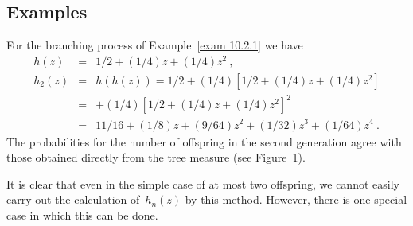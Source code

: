 \subsection*{Examples}

\begin{example}\label{exam 10.2.3.5}
For the branching process of Example~\ref{exam 10.2.1} we have
\begin{eqnarray*}
  h(z) &=& 1/2 + (1/4)z + (1/4)z^2\ , \\
h_2(z) &=& h(h(z)) = 1/2 + (1/4)[1/2 + (1/4)z + (1/4)z^2] \\
       &=& + (1/4)[1/2 + (1/4)z + (1/4)z^2]^2 \\
       &=& 11/16 + (1/8)z + (9/64)z^2 + (1/32)z^3 + (1/64)z^4\ .
\end{eqnarray*}
The probabilities for the number of offspring in the second generation agree
with those obtained directly from the tree measure (see Figure~1).
\end{example}

It is clear that even in the simple case of at most two offspring, we cannot
easily carry out the calculation of~$h_n(z)$ by this method.  However, there is
one special case in which this can be done.

